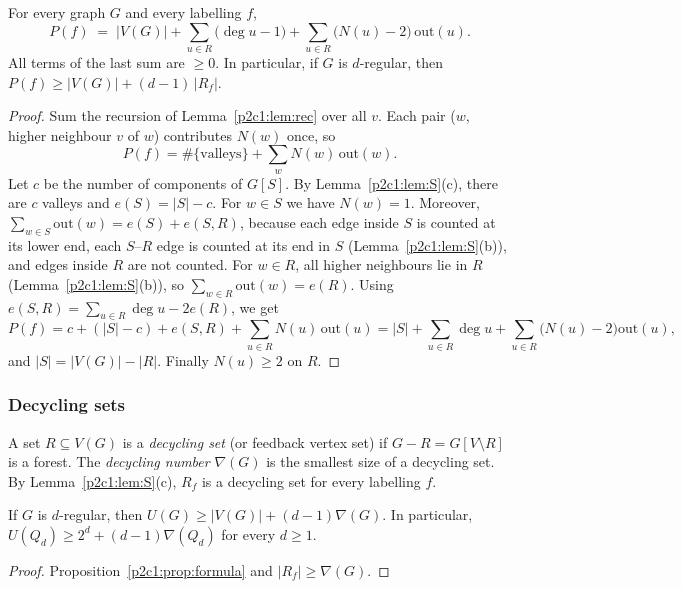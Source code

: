 \begin{proposition}\label{p2c1:prop:formula}
For every graph $G$ and every labelling $f$,
\[
  P(f)\;=\;|V(G)|+\sum_{u\in R}\bigl(\deg u-1\bigr)+\sum_{u\in R}\bigl(N(u)-2\bigr)\,\mathrm{out}(u).
\]
All terms of the last sum are $\ge0$. In particular, if $G$ is $d$-regular, then
$P(f)\ge|V(G)|+(d-1)\,|R_f|$.
\end{proposition}

\begin{proof}
Sum the recursion of Lemma~\ref{p2c1:lem:rec} over all $v$. Each pair ($w$, higher neighbour
$v$ of $w$) contributes $N(w)$ once, so
\[
  P(f)=\#\{\text{valleys}\}+\sum_wN(w)\,\mathrm{out}(w).
\]
Let $c$ be the number of components of $G[S]$. By Lemma~\ref{p2c1:lem:S}(c), there are $c$ valleys
and $e(S)=|S|-c$. For $w\in S$ we have $N(w)=1$. Moreover, $\sum_{w\in S}\mathrm{out}(w)=e(S)+e(S,R)$,
because each edge inside $S$ is counted at its lower end, each $S$--$R$ edge is counted at its end
in $S$ (Lemma~\ref{p2c1:lem:S}(b)), and edges inside $R$ are not counted. For $w\in R$, all
higher neighbours lie in $R$ (Lemma~\ref{p2c1:lem:S}(b)), so $\sum_{w\in R}\mathrm{out}(w)=e(R)$.
Using $e(S,R)=\sum_{u\in R}\deg u-2e(R)$, we get
\[
  P(f)=c+(|S|-c)+e(S,R)+\sum_{u\in R}N(u)\,\mathrm{out}(u)
      =|S|+\sum_{u\in R}\deg u+\sum_{u\in R}\bigl(N(u)-2\bigr)\mathrm{out}(u),
\]
and $|S|=|V(G)|-|R|$. Finally $N(u)\ge2$ on $R$.
\end{proof}

\subsubsection{Decycling sets}\label{p2c1:sec:dec}

A set $R\subseteq V(G)$ is a \emph{decycling set} (or feedback vertex set) if $G-R=G[V\setminus R]$ is a
forest. The \emph{decycling number} $\nabla(G)$ is the smallest size of a decycling set. By
Lemma~\ref{p2c1:lem:S}(c), $R_f$ is a decycling set for every labelling $f$.

\begin{theorem}\label{p2c1:thm:lower}
If $G$ is $d$-regular, then $U(G)\ge|V(G)|+(d-1)\nabla(G)$. In particular,
$U(Q_d)\ge2^d+(d-1)\nabla(Q_d)$ for every $d\ge1$.
\end{theorem}

\begin{proof}
Proposition~\ref{p2c1:prop:formula} and $|R_f|\ge\nabla(G)$.
\end{proof}


